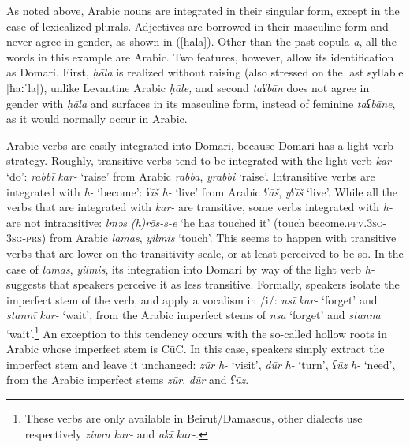 \documentclass[output=paper]{langsci/langscibook}
\begin{document}
As noted above, Arabic nouns are integrated in their singular form, except in the case of lexicalized plurals. Adjectives are borrowed in their masculine form and never agree in gender, as shown in (\ref{hala}). Other than the past copula \textit{a}, all the words in this example are Arabic. Two features, however, allow its identification as Domari. First, \textit{ḥāla} is realized without raising (also stressed on the last syllable [ħaːˈla]), unlike Levantine Arabic \textit{ḥāle,} and second \textit{taʕbān} does not agree in gender with \textit{ḥāla} and surfaces in its masculine form, instead of feminine \textit{taʕbāne}, as it would normally occur in Arabic.


Arabic verbs are easily integrated into Domari, because Domari has a light verb strategy. Roughly, transitive verbs tend to be integrated with the light verb \textit{kar-} ‘do’: \textit{rabbī} \textit{kar-} ‘raise’ from Arabic \textit{rabba}, \textit{yrabbi} ‘raise’. Intransitive verbs are integrated with \textit{h-} ‘become’: \textit{ʕīš} \textit{h-} ‘live’ from Arabic \textit{ʕāš}, \textit{yʕīš} ‘live’. While all the verbs that are integrated with \textit{kar-} are transitive, some verbs integrated with \textit{h-} are not intransitive: \textit{lməs} \textit{(h)rōs-s-e} ‘he has touched it’ (touch become.\textsc{pfv.3sg-3sg-prs}) from Arabic \textit{lamas}, \textit{yilmis} ‘touch’. This seems to happen with transitive verbs that are lower on the transitivity scale, or at least perceived to be so. In the case of \textit{lamas}, \textit{yilmis}, its integration into Domari by way of the light verb \textit{h-} suggests that speakers perceive it as less transitive. Formally, speakers isolate the imperfect stem of the verb, and apply a vocalism in /i/: \textit{nsī} \textit{kar-} ‘forget’ and \textit{stannī} \textit{kar-} ‘wait’, from the Arabic imperfect stems of \textit{nsa} ‘forget’ and \textit{stanna} ‘wait’.\footnote{These verbs are only available in Beirut/Damascus, other dialects use respectively \textit{ziwra} \textit{kar-} and \textit{akī} \textit{kar-}.} An exception to this tendency occurs with the so-called hollow roots in Arabic whose imperfect stem is CūC. In this case, speakers simply extract the imperfect stem and leave it unchanged: \textit{zūr} \textit{h-} ‘visit’, \textit{dūr} \textit{h-} ‘turn’, \textit{ʕūz} \textit{h-} ‘need’, from the Arabic imperfect stems \textit{zūr}, \textit{dūr} and \textit{ʕūz}.
\end{document}
